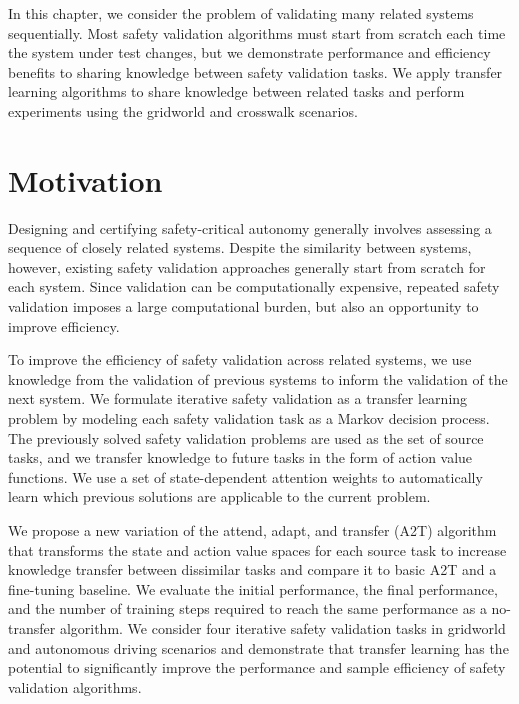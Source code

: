 In this chapter, we consider the problem of validating many related systems sequentially. Most safety validation algorithms must start from scratch each time the system under test changes, but we demonstrate performance and efficiency benefits to sharing knowledge between safety validation tasks. We apply transfer learning algorithms to share knowledge between related tasks and perform experiments using the gridworld and crosswalk scenarios.

\section{Motivation}
Designing and certifying safety-critical autonomy generally involves assessing a sequence of closely related systems. Despite the similarity between systems, however, existing safety validation approaches generally start from scratch for each system. Since validation can be computationally expensive, repeated safety validation imposes a large computational burden, but also an opportunity to improve efficiency. 

To improve the efficiency of safety validation across related systems, we use knowledge from the validation of previous systems to inform the validation of the next system. We formulate iterative safety validation as a transfer learning problem by modeling each safety validation task as a Markov decision process. The previously solved safety validation problems are used as the set of source tasks, and we transfer knowledge to future tasks in the form of action value functions. We use a set of state-dependent attention weights to automatically learn which previous solutions are applicable to the current problem.

We propose a new variation of the attend, adapt, and transfer (A2T) algorithm~\cite{rajendran2017attend} that transforms the state and action value spaces for each source task to increase knowledge transfer between dissimilar tasks and compare it to basic A2T and a fine-tuning baseline. We evaluate the initial performance, the final performance, and the number of training steps required to reach the same performance as a no-transfer algorithm. We consider four iterative safety validation tasks in gridworld and autonomous driving scenarios and demonstrate that transfer learning has the potential to significantly improve the performance and sample efficiency of safety validation algorithms.



